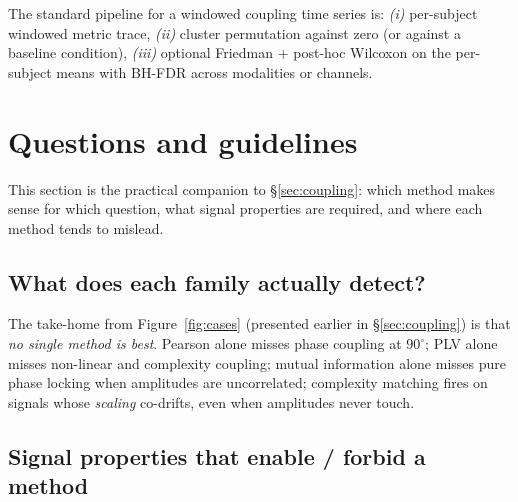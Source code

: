 \documentclass[11pt,a4paper]{article}
\begin{document}
The standard pipeline for a windowed coupling time series is:
\emph{(i)} per-subject windowed metric trace, \emph{(ii)} cluster
permutation against zero (or against a baseline condition), \emph{(iii)}
optional Friedman + post-hoc Wilcoxon on the per-subject means with
BH-FDR across modalities or channels.

\section{Questions and guidelines}
\label{sec:guidelines}

This section is the practical companion to \S\ref{sec:coupling}: which
method makes sense for which question, what signal properties are
required, and where each method tends to mislead.

\subsection{What does each family actually detect?}

The take-home from Figure~\ref{fig:cases} (presented earlier in
\S\ref{sec:coupling}) is that \emph{no single method is best}.
Pearson alone misses phase coupling at $90^\circ$; PLV alone misses
non-linear and complexity coupling; mutual information alone misses
pure phase locking when amplitudes are uncorrelated; complexity
matching fires on signals whose \emph{scaling} co-drifts, even when
amplitudes never touch.

\subsection{Signal properties that enable / forbid a method}
\end{document}
